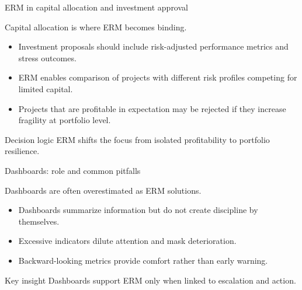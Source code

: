 \documentclass[aspectratio=169, 10pt]{beamer} %
\begin{document}
\begin{frame}{ERM in capital allocation and investment approval}

Capital allocation is where ERM becomes binding.

\medskip

\begin{itemize}
  \item[$\bullet$] Investment proposals should include risk-adjusted performance
  metrics and stress outcomes.

  \item[$\bullet$] ERM enables comparison of projects with different risk
  profiles competing for limited capital.

  \item[$\bullet$] Projects that are profitable in expectation may be rejected
  if they increase fragility at portfolio level.
\end{itemize}

\begin{block}{Decision logic}
ERM shifts the focus from isolated profitability to portfolio resilience.
\end{block}

\end{frame}

\begin{frame}{Dashboards: role and common pitfalls}

Dashboards are often overestimated as ERM solutions.

\medskip

\begin{itemize}
  \item[$\bullet$] Dashboards summarize information but do not create discipline
  by themselves.

  \item[$\bullet$] Excessive indicators dilute attention and mask deterioration.

  \item[$\bullet$] Backward-looking metrics provide comfort rather than early
  warning.
\end{itemize}

\begin{block}{Key insight}
Dashboards support ERM only when linked to escalation and action.
\end{block}

\end{frame}
\end{document}
